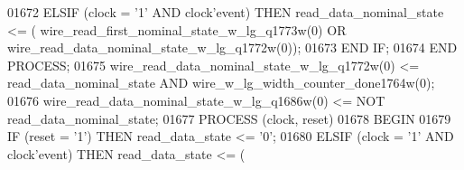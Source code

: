 \begin{DoxyCode}
{01672         \textcolor{keywordflow}{ELSIF} \textcolor{vhdlchar}{(}\textcolor{vhdlchar}{clock} \textcolor{vhdlchar}{=} \textcolor{vhdlchar}{'}\textcolor{vhdllogic}{}\textcolor{vhdllogic}{1}\textcolor{vhdlchar}{'} \textcolor{keywordflow}{AND} \textcolor{vhdlchar}{clock}\textcolor{vhdlchar}{'}\textcolor{vhdlkeyword}{event}\textcolor{vhdlchar}{)} \textcolor{keywordflow}{THEN} \textcolor{vhdlchar}{read_data_nominal_state} \textcolor{vhdlchar}{<=} \textcolor{vhdlchar}{(}\textcolor{vhdlchar}{
      wire_read_first_nominal_state_w_lg_q1773w}\textcolor{vhdlchar}{(}\textcolor{vhdllogic}{}\textcolor{vhdllogic}{0}\textcolor{vhdlchar}{)} \textcolor{keywordflow}{OR} \textcolor{vhdlchar}{
      wire_read_data_nominal_state_w_lg_q1772w}\textcolor{vhdlchar}{(}\textcolor{vhdllogic}{}\textcolor{vhdllogic}{0}\textcolor{vhdlchar}{)}\textcolor{vhdlchar}{)};
01673         \textcolor{keywordflow}{END} \textcolor{keywordflow}{IF};
01674     \textcolor{keywordflow}{END} \textcolor{keywordflow}{PROCESS};
01675     \textcolor{vhdlchar}{wire_read_data_nominal_state_w_lg_q1772w}\textcolor{vhdlchar}{(}\textcolor{vhdllogic}{}\textcolor{vhdllogic}{0}\textcolor{vhdlchar}{)} \textcolor{vhdlchar}{<=} \textcolor{vhdlchar}{read_data_nominal_state} \textcolor{keywordflow}{AND} \textcolor{vhdlchar}{
      wire_w_lg_width_counter_done1764w}\textcolor{vhdlchar}{(}\textcolor{vhdllogic}{}\textcolor{vhdllogic}{0}\textcolor{vhdlchar}{)};
01676     \textcolor{vhdlchar}{wire_read_data_nominal_state_w_lg_q1686w}\textcolor{vhdlchar}{(}\textcolor{vhdllogic}{}\textcolor{vhdllogic}{0}\textcolor{vhdlchar}{)} \textcolor{vhdlchar}{<=} \textcolor{keywordflow}{NOT} \textcolor{vhdlchar}{read_data_nominal_state};
01677     \textcolor{keywordflow}{PROCESS} (clock, reset)
01678 \textcolor{vhdlkeyword}{    BEGIN}
01679         \textcolor{keywordflow}{IF} \textcolor{vhdlchar}{(}\textcolor{vhdlchar}{reset} \textcolor{vhdlchar}{=} \textcolor{vhdlchar}{'}\textcolor{vhdllogic}{}\textcolor{vhdllogic}{1}\textcolor{vhdlchar}{'}\textcolor{vhdlchar}{)} \textcolor{keywordflow}{THEN} \textcolor{vhdlchar}{read_data_state} \textcolor{vhdlchar}{<=} \textcolor{vhdlchar}{'}\textcolor{vhdllogic}{}\textcolor{vhdllogic}{0}\textcolor{vhdlchar}{'};
01680         \textcolor{keywordflow}{ELSIF} \textcolor{vhdlchar}{(}\textcolor{vhdlchar}{clock} \textcolor{vhdlchar}{=} \textcolor{vhdlchar}{'}\textcolor{vhdllogic}{}\textcolor{vhdllogic}{1}\textcolor{vhdlchar}{'} \textcolor{keywordflow}{AND} \textcolor{vhdlchar}{clock}\textcolor{vhdlchar}{'}\textcolor{vhdlkeyword}{event}\textcolor{vhdlchar}{)} \textcolor{keywordflow}{THEN} \textcolor{vhdlchar}{read_data_state} \textcolor{vhdlchar}{<=} \textcolor{vhdlchar}{(}\textcolor{vhdlchar}{
}}
\end{DoxyCode}
